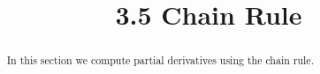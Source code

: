 \documentclass[handout]{ximera}
\title{3.5 Chain Rule}
\begin{document}
\begin{abstract}
In this section we compute partial derivatives using the chain rule.
\end{abstract}

\maketitle
\end{document}
